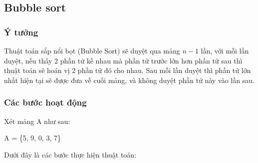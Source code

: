 \subsection{Bubble sort}

\subsubsection{Ý tưởng}

Thuật toán sắp nổi bọt (Bubble Sort) sẽ duyệt qua mảng $n - 1$ lần, với mỗi lần duyệt, nếu thấy 2 phần tử kề nhau mà phần tử trước lớn hơn phần tử sau thì thuật toán sẽ hoán vị 2 phần tử đó cho nhau. Sau mỗi lần duyệt thì phần tử lớn nhất hiện tại sẽ được đưa về cuối mảng, và không duyệt phần tử này vào lần sau.

\subsubsection{Các bước hoạt động}
Xét mảng A như sau: 
\begin{center}
   A = \{5, 9, 0, 3, 7\} 
\end{center} 
Dưới đây là các bước thực hiện thuật toán:

